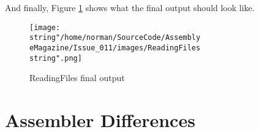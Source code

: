 And finally, Figure \ref{fig:ReadingFiles-final-output} shows what
the final output should look like.

\begin{figure}[!h]
\begin{centering}
\texttt{[image: \\string"/home/norman/SourceCode/Assembly eMagazine/Issue\_011/images/ReadingFiles\\string".png]}
\par\end{centering}
\caption{ReadingFiles final output\label{fig:ReadingFiles-final-output}}

\end{figure}


\section{Assembler Differences}

